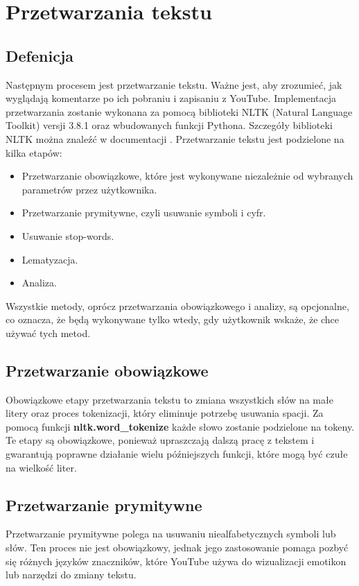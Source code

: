 \section{Przetwarzania tekstu}

	\subsection{Defenicja}
		Następnym procesem jest przetwarzanie tekstu. Ważne jest, aby zrozumieć, jak wyglądają komentarze po ich pobraniu i zapisaniu z YouTube. Implementacja przetwarzania zostanie wykonana za pomocą biblioteki NLTK (Natural Language Toolkit) versji 3.8.1 oraz wbudowanych funkcji Pythona. Szczegóły biblioteki NLTK można znaleźć w documentacji \cite{nltk}. Przetwarzanie tekstu jest podzielone na kilka etapów:
		\begin{itemize}
			\item Przetwarzanie obowiązkowe, które jest wykonywane niezależnie od wybranych parametrów przez użytkownika.
			\item Przetwarzanie prymitywne, czyli usuwanie symboli i cyfr.
			\item Usuwanie stop-words.
			\item Lematyzacja.
			\item Analiza.
		\end{itemize}
		Wszystkie metody, oprócz przetwarzania obowiązkowego i analizy, są opcjonalne, co oznacza, że będą wykonywane tylko wtedy, gdy użytkownik wskaże, że chce używać tych metod.
		
	\subsection{Przetwarzanie obowiązkowe}
		Obowiązkowe etapy przetwarzania tekstu to zmiana wszystkich słów na małe litery oraz proces tokenizacji, który eliminuje potrzebę usuwania spacji. Za pomocą funkcji \textbf{nltk.word\_tokenize} każde słowo zostanie podzielone na tokeny. Te etapy są obowiązkowe, ponieważ upraszczają dalszą pracę z tekstem i gwarantują poprawne działanie wielu późniejszych funkcji, które mogą być czułe na wielkość liter.
	
		
	\subsection{Przetwarzanie prymitywne}
		Przetwarzanie prymitywne polega na usuwaniu niealfabetycznych symboli lub słów. Ten proces nie jest obowiązkowy, jednak jego zastosowanie pomaga pozbyć się różnych języków znaczników, które YouTube używa do wizualizacji emotikon lub narzędzi do zmiany tekstu.

